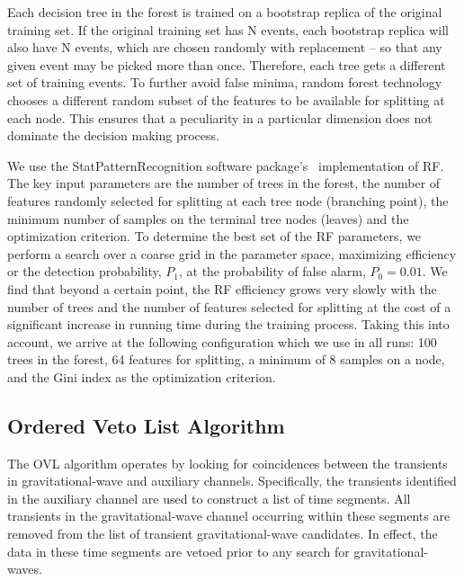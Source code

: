 \documentclass[prd, twocolumn, lengthcheck, superscriptaddress, showpacs, letterpaper, nofootinbib]{revtex4-1}
\begin{document}
Each decision tree in the forest is trained on a bootstrap replica of the
original training set. If the original training set has N events, each
bootstrap replica will also have N events, which are chosen randomly with
replacement -- so that any given event may be picked more than once. Therefore,
each tree gets a different set of training events. To further avoid false
minima, random forest technology chooses a different random subset of the
features to be available for splitting at each node. This ensures that a
peculiarity in a particular dimension does not dominate the decision making
process.

We use the StatPatternRecognition software package's~\cite{StatPatternRecognitionPackage} implementation of \ac{RF}. The key input parameters are the number of trees in the forest, the number of features randomly selected for splitting at each tree node (branching point), the minimum number of samples on the terminal tree nodes (leaves) and the optimization criterion. To determine the best set of the \ac{RF} parameters, we perform a search over a coarse grid in the parameter space, maximizing efficiency or the detection probability, $P_1$, at the probability of false alarm, $P_0 = 0.01$. We find that beyond a certain point, the \ac{RF} efficiency grows very slowly with the number of trees and the number of features selected for splitting  at the cost of a significant increase in running time during the training process. Taking this into account, we arrive at the following configuration which we use in all runs: 100 trees in the forest, 64 features for splitting, a minimum of 8 samples on a node, and the Gini index as the optimization criterion.


\subsection{Ordered Veto List Algorithm}
The \ac{OVL} algorithm operates by looking for coincidences between the transients in gravitational-wave and auxiliary channels. Specifically, the transients identified in the auxiliary channel are used to construct a list of time segments. All transients in the gravitational-wave channel occurring within these segments are removed from the list of transient gravitational-wave candidates. In effect, the data in these time segments are vetoed prior to any search for gravitational-waves.  
\end{document}
